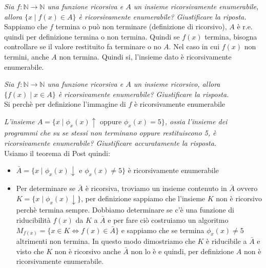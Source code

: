 \documentclass[12pt, a4paper]{report}
\begin{document}
        \begin{exercise}
            \textit{Sia $f:\mathbb{N}\to\mathbb{N}$ una funzione ricorsiva e $A$ un insieme ricorsivamente enumerabile, allora $\{x\mid f(x)\in A\}$ è ricorsivamente enumerabile? Giustificare la riposta.}\\
            Sappiamo che $f$ termina o può non terminare (definizione di ricorsivo), $A$ è r.e. quindi per definizione termina o non termina. Quindi se $f(x)$ termina, bisogna controllare se il valore restituito fa terminare o no $A$. Nel caso in cui $f(x)$ non termini, anche $A$ non termina. Quindi si, l'insieme dato è ricorsivamente enumerabile.
        \end{exercise}
        \begin{exercise}
            \textit{Sia $f:\mathbb{N}\to\mathbb{N}$ una funzione ricorsiva e $A$ un insieme ricorsivo, allora $\{f(x)\mid x\in A\}$ è ricorsivamente enumerabile? Giustificare la risposta.}\\
            Si perchè per definizione l'immagine di $f$ è ricorsivamente enumerabile
        \end{exercise}
        \begin{exercise}
            \textit{L'insieme $A=\{x\mid\phi_x(x)\uparrow \text{ oppure } \phi_x(x)=5\}$, ossia l'insieme dei programmi che su se stessi non terminano oppure restituiscono 5, è ricorsivamente enumerabile? Giustificare accuratamente la risposta.}\\
            Usiamo il teorema di Post quindi:
            \begin{itemize}
                \item $\bar{A}=\{x\mid\phi_x(x)\downarrow\text{ e }\phi_x(x)\neq 5\}$ è ricorsivamente enumerabile
                \item Per determinare se $\bar{A}$ è ricorsiva, troviamo un insieme contenuto in $\bar{A}$ ovvero $K=\{x\mid\phi_x(x)\downarrow\}$, per definizione sappiamo che l'insieme $K$ non è ricorsivo perchè termina sempre. Dobbiamo determinare se c'è una funzione di riducibilità $f(x)$ da $K$ a $\bar{A}$ e per fare ciò costruiamo un algoritmo $M_{f(x)}=\{x\in K \iff f(x)\in\bar{A}\}$ e sappiamo che se termina $\phi_x(x)\neq 5$ altrimenti non termina. In questo modo dimostriamo che $K$ è riducibile a $\bar{A}$ e visto che $K$ non è ricorsivo anche $\bar{A}$ non lo è e quindi, per definizione $A$ non è ricorsivamente enumerabile.
            \end{itemize}
        \end{exercise}
\end{document}
